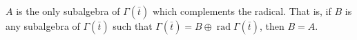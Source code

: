 $A$ is the only subalgebra of $\Gamma(\bar{t})$ which complements the radical. That is, if $B$ is any subalgebra of $\Gamma(\bar{t})$ such that $\Gamma(\bar{t}) = B \oplus \operatorname{rad} \Gamma(\bar{t})$, then $B = A$.
